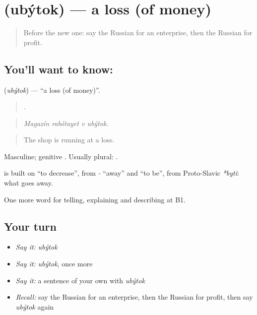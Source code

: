 \section[\texorpdfstring{\ru{убыток} (ubýtok)}{убыток (ubýtok)}]{ (ubýtok) — a loss (of money)}

\label{lesson:RU-C361-ubytok}



\begin{quote}
Before the new one: say the Russian for an enterprise, then the Russian for profit.
\end{quote}

\subsection*{You'll want to know: }
\textbf{} (\emph{ubýtok}) — \textquotedblleft{}a loss (of money)\textquotedblright{}.

\begin{quote}
   .
\end{quote}

\begin{quote}
\emph{Magazín rabótayet v ubýtok.}
\end{quote}

\begin{quote}
The shop is running at a loss.
\end{quote}

Masculine; genitive \emph{}. Usually plural: \emph{ }.

\begin{cousinweb}
\textbf{} is built on \emph{} \textquotedblleft{}to decrease\textquotedblright{}, from \emph{-} \textquotedblleft{}away\textquotedblright{} and \emph{} \textquotedblleft{}to be\textquotedblright{}, from Proto-Slavic \emph{*byti}: what goes away.
\end{cousinweb}

\begin{grammarlens}[title={What you've built}]
One more word for telling, explaining and describing at B1.
\end{grammarlens}

\subsection*{Your turn}
\begin{itemize}
\raggedright
  \item \emph{Say it:} \emph{ubýtok}
  \item \emph{Say it:} \emph{ubýtok}, once more
  \item \emph{Say it:} a sentence of your own with \emph{ubýtok}
  \item \emph{Recall:} say the Russian for an enterprise, then the Russian for profit, then say \emph{ubýtok} again
\end{itemize}

